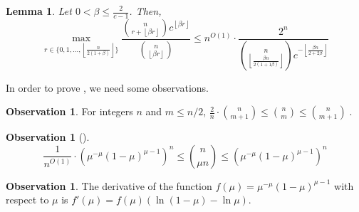 \documentclass[11pt, letterpaper]{article}
\newtheorem{lemma}[theorem]{Lemma}
\theoremstyle{definition}
\newtheorem{observation}[theorem]{Observation}
\newcommand{\floor}[1]{{\left\lfloor{#1}\right\rfloor}}
\begin{document}
\begin{lemma} \label{lem:derivative}
    Let $0 < \beta \leq \frac{2}{c-1}$. Then,
    \[ \max_{r \in \{0,1,\dots, \floor{\frac{n}{2(1+\beta)}}\}} \frac{ \binom{n}{r+\floor{\beta r}} c^{\floor{\beta r}}}{    \binom{n}{\floor{\beta r}}} \leq n^{O(1)} \cdot  \frac{2^n}{\binom{n}{\floor{ \frac{\beta n}{2(1+1 \beta)}}} c^{-\floor{\frac{\beta n}{2+2 \beta}}}}\]
\end{lemma}

In order to prove , we need some observations.

\begin{observation} \label{obs:binomone}
    For integers $n$ and $m \leq n/2$, $\frac{2}{n} \cdot \binom{n}{m+1} \leq \binom{n}{m} \leq \binom{n}{m+1} \; .$
\end{observation}

\begin{observation}[\cite{macwilliams1977theory}] \label{obs:binomapprox}
\begin{equation*}
   \frac{1}{n^{O(1)}} \cdot \left(\mu^{-\mu} (1-\mu)^{\mu-1} \right)^n \leq \binom{n}{\mu n} \leq \left(\mu^{-\mu}  (1-\mu)^{\mu-1} \right)^n
\end{equation*}
\end{observation}

\begin{observation} \label{obs:binomderivative}
    The derivative of the function $f(\mu)=\mu^{-\mu} (1-\mu)^{\mu-1} $ with respect to $\mu$ is $f'(\mu)=f(\mu) \left( \ln{(1-\mu)} - \ln{\mu} \right)$.
\end{observation}
\end{document}
